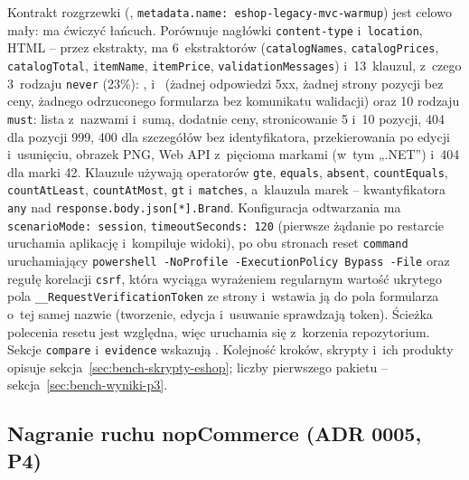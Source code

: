 Kontrakt rozgrzewki (, \texttt{metadata.name:
eshop-legacy-mvc-warmup}) jest celowo mały: ma ćwiczyć łańcuch. Porównuje nagłówki
\texttt{content-type} i~\texttt{location}, HTML -- przez ekstrakty, ma 6~ekstraktorów
(\texttt{catalogNames}, \texttt{catalogPrices}, \texttt{catalogTotal}, \texttt{itemName},
\texttt{itemPrice}, \texttt{validationMessages}) i~13~klauzul, z~czego 3~rodzaju \texttt{never} (23\%):
, 
i~ (żadnej odpowiedzi 5xx, żadnej strony pozycji bez
ceny, żadnego odrzuconego formularza bez komunikatu walidacji) oraz 10 rodzaju
\texttt{must}: lista z~nazwami i~sumą, dodatnie ceny, stronicowanie 5 i~10 pozycji, 404
dla pozycji 999, 400 dla szczegółów bez identyfikatora, przekierowania po edycji
i~usunięciu, obrazek PNG, Web API z~pięcioma markami (w~tym „.NET”) i~404 dla marki 42.
Klauzule używają operatorów \texttt{gte}, \texttt{equals}, \texttt{absent},
\texttt{countEquals}, \texttt{countAtLeast}, \texttt{countAtMost}, \texttt{gt}
i~\texttt{matches}, a~klauzula marek -- kwantyfikatora \texttt{any} nad
\texttt{response.body.json[*].Brand}. Konfiguracja odtwarzania
 ma \texttt{scenarioMode: session},
\texttt{timeoutSeconds: 120} (pierwsze żądanie po restarcie uruchamia aplikację
i~kompiluje widoki), po obu stronach reset \texttt{command} uruchamiający
\texttt{powershell -NoProfile -ExecutionPolicy Bypass -File}
 oraz regułę korelacji \texttt{csrf}, która wyciąga wyrażeniem regularnym wartość ukrytego
pola \texttt{\_\_RequestVerificationToken} ze strony i~wstawia ją do pola formularza
o~tej samej nazwie (tworzenie, edycja i~usuwanie sprawdzają token). Ścieżka polecenia resetu jest względna, więc  uruchamia się z~korzenia
repozytorium. Sekcje \texttt{compare} i~\texttt{evidence} wskazują .
Kolejność kroków, skrypty i~ich produkty opisuje sekcja~\ref{sec:bench-skrypty-eshop};
liczby pierwszego pakietu -- sekcja~\ref{sec:bench-wyniki-p3}.


\subsection{Nagranie ruchu nopCommerce (ADR 0005, P4)}\label{sec:bench-ruch}

